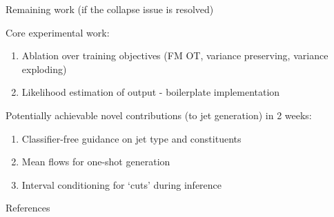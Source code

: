 \documentclass[handout, aspectratio=169,xcolor=dvipsnames]{beamer}
\begin{document}
\begin{frame}{Remaining work (if the collapse issue is resolved)}
    
    Core experimental work:
    \begin{enumerate}
        \item Ablation over training objectives (FM OT, variance preserving, variance exploding)
        \item Likelihood estimation of output - boilerplate implementation
    \end{enumerate}

    \vspace{0.5cm}

    Potentially achievable novel contributions (to jet generation) in 2 weeks:
    \begin{enumerate}
        \item Classifier-free guidance on jet type and constituents \parencite{hoClassifierFreeDiffusionGuidance2022,fanCFGZeroImprovedClassifierFree2025}
        \item Mean flows for one-shot generation \parencite{gengMeanFlowsOnestep2025}
        \item Interval conditioning for `cuts' during inference \parencite{bansalUniversalGuidanceDiffusion2023, gloecklerAllinoneSimulationbasedInference2024}
    \end{enumerate}    
\end{frame}

\begin{frame}[allowframebreaks]{References}
\printbibliography
\end{frame}
\end{document}
